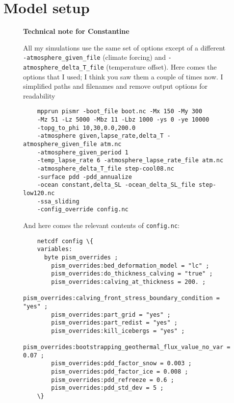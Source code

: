 
\section{Model setup}
\label{sec:setup}

\begin{figure}\begin{framed}
	\textbf{Technical note for Constantine}

	All my simulations use the same set of options except of a different \verb|-atmosphere_given_file| (climate forcing) and \verb|-atmosphere_delta_T_file| (temperature offset). Here comes the options that I used; I think you saw them a couple of times now. I simplified paths and filenames and remove output options for readability

	\begin{verbatim}
	mpprun pismr -boot_file boot.nc -Mx 150 -My 300
	-Mz 51 -Lz 5000 -Mbz 11 -Lbz 1000 -ys 0 -ye 10000
	-topg_to_phi 10,30,0.0,200.0
	-atmosphere given,lapse_rate,delta_T -atmosphere_given_file atm.nc
	-atmosphere_given_period 1
	-temp_lapse_rate 6 -atmosphere_lapse_rate_file atm.nc
	-atmosphere_delta_T_file step-cool08.nc
	-surface pdd -pdd_annualize
	-ocean constant,delta_SL -ocean_delta_SL_file step-low120.nc
	-ssa_sliding
	-config_override config.nc
	\end{verbatim}

	And here comes the relevant contents of \verb|config.nc|:

	\begin{verbatim}
	netcdf config \{
	variables:
	  byte pism_overrides ;
	    pism_overrides:bed_deformation_model = "lc" ;
	    pism_overrides:do_thickness_calving = "true" ;
	    pism_overrides:calving_at_thickness = 200. ;
	    pism_overrides:calving_front_stress_boundary_condition = "yes" ;
	    pism_overrides:part_grid = "yes" ;
	    pism_overrides:part_redist = "yes" ;
	    pism_overrides:kill_icebergs = "yes" ;
	    pism_overrides:bootstrapping_geothermal_flux_value_no_var = 0.07 ;
	    pism_overrides:pdd_factor_snow = 0.003 ;
	    pism_overrides:pdd_factor_ice = 0.008 ;
	    pism_overrides:pdd_refreeze = 0.6 ;
	    pism_overrides:pdd_std_dev = 5 ;
	\}
 
	\end{verbatim}

\end{framed}\end{figure}

